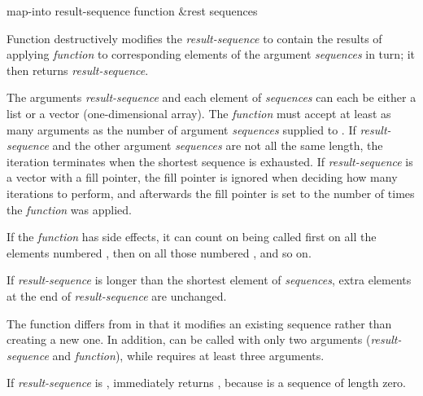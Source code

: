 \begin{defun}[Function]
map-into result-sequence function &rest sequences

Function  destructively modifies the \emph{result-sequence} to
contain the results of applying \emph{function} to corresponding elements of
the argument \emph{sequences} in turn; it then
returns \emph{result-sequence}.

The arguments \emph{result-sequence}
and each element of \emph{sequences} can each be
either a list or a vector (one-dimensional array).
The \emph{function} must accept at least as many arguments as the
number of argument \emph{sequences} supplied to .
If \emph{result-sequence} and
the other argument \emph{sequences} are not all the same length, the iteration
terminates when the shortest sequence is exhausted.  If \emph{result-sequence}
is a vector with a fill pointer, the fill pointer is ignored when
deciding how many iterations to perform, and afterwards the
fill pointer is set to the number of times the \emph{function} was applied.

If the \emph{function} has side effects, it can count on being called
first on all the elements numbered , then on all those
numbered , and so on.

If \emph{result-sequence} is longer than the shortest element of \emph{sequences},
extra elements at the end of \emph{result-sequence} are unchanged.

The function  differs from  in that it modifies
an existing sequence rather than creating a new one.  In addition,
 can be called with only two arguments (\emph{result-sequence}
and \emph{function}), while  requires at least three arguments.

If \emph{result-sequence} is ,  immediately returns
, because  is a sequence of length zero.
\end{defun}


